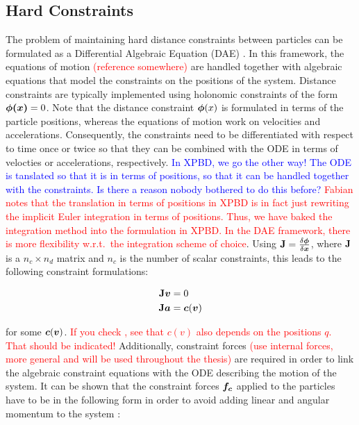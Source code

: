 \subsection{Hard Constraints}\label{ss:hard-constraints}
The problem of maintaining hard distance constraints between particles can be formulated as a Differential Algebraic Equation (DAE)
\cite{ascher1995, baraff1996}. In this framework, the equations of motion \textcolor{red}{(reference somewhere)} are handled together 
with algebraic equations that model the constraints on the positions of the system. Distance constraints are typically implemented using 
holonomic constraints 
of the form $\bm{\phi(x)} = 0$. Note that the distance constraint $\bm{\phi}(x)$ is formulated in terms of the particle positions, 
whereas the equations of motion work on velocities and accelerations. Consequently, the constraints need to be differentiated with 
respect to time once or twice so that they can be 
combined with the ODE in terms of velocties or accelerations, respectively. \textcolor{blue}{In XPBD, we go the other way! The ODE
is tanslated so that it is in terms of positions, so that it can be handled together with the constraints. Is there a reason nobody 
bothered to do this before?} \textcolor{red}{Fabian notes that the translation in terms of positions in XPBD is in fact just rewriting
the implicit Euler integration in terms of positions. Thus, we have baked the integration method into the formulation in XPBD. In the DAE
framework, there is more flexibility w.r.t.\ the integration scheme of choice}. Using $\mathbf{J} = \frac{\delta \bm{\phi}}{\delta \bm{x}}$, 
where $\mathbf{J}$ is a $n_c \times n_d$ matrix and $n_c$ is the number of scalar constraints, this leads to the following constraint 
formulations:

\begin{align*}
    \mathbf{J}\bm{v} &= 0 \\
    \mathbf{J}\bm{a} &= \bm{c}(\bm{v})
\end{align*}

for some $\bm{c}(\bm{v})$. \textcolor{red}{If you check \cite{ascher1995}, see that $c(v)$ also depends on the positions $q$. That should 
be indicated!} 
Additionally, constraint forces \textcolor{red}{(use internal forces, more general and will be used throughout the thesis)} are 
required in order to link the algebraic constraint equations with the ODE describing the motion of 
the system. It can be shown that the constraint forces $\bm{f_c}$ applied to the particles have to be in the following form in order to 
avoid adding linear and angular momentum to the system \cite{baraff1996}:

